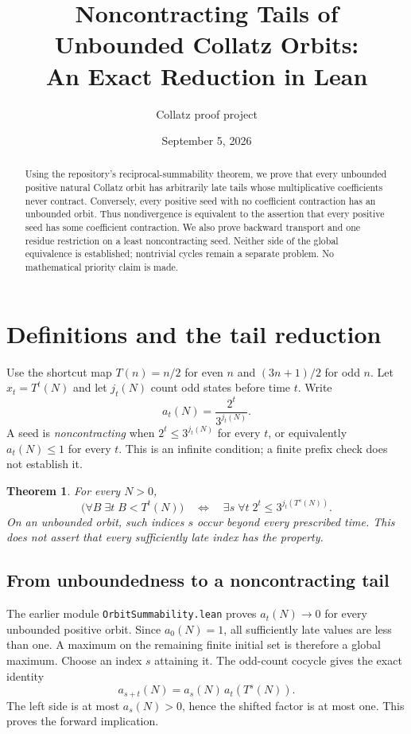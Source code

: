 \documentclass[10pt]{article}
\title{Noncontracting Tails of Unbounded Collatz Orbits:\\An Exact Reduction in Lean}
\author{Collatz proof project}
\date{September 5, 2026}
\newtheorem{theorem}{Theorem}
\begin{document}
\maketitle
\begin{abstract}
Using the repository's reciprocal-summability theorem, we prove that every
unbounded positive natural Collatz orbit has arbitrarily late tails whose
multiplicative coefficients never contract. Conversely, every positive
seed with no coefficient contraction has an unbounded orbit. Thus
nondivergence is equivalent to the assertion that every positive seed
has some coefficient contraction. We also prove backward transport and
one residue restriction on a least noncontracting seed. Neither side of
the global equivalence is established; nontrivial cycles remain a separate
problem. No mathematical priority claim is made.
\end{abstract}

\section{Definitions and the tail reduction}
Use the shortcut map $T(n)=n/2$ for even $n$ and $(3n+1)/2$ for odd $n$.
Let $x_t=T^t(N)$ and let $j_t(N)$ count odd states before time $t$. Write
\[
a_t(N)=\frac{2^t}{3^{j_t(N)}}.
\]
A seed is \emph{noncontracting} when $2^t\le3^{j_t(N)}$ for every $t$,
or equivalently $a_t(N)\le1$ for every $t$. This is an infinite condition;
a finite prefix check does not establish it.
\begin{theorem}\label{thm:tail}
For every $N>0$,
\[
\bigl(\forall B\;\exists t\;B<T^t(N)\bigr)
\quad\Longleftrightarrow\quad
\exists s\;\forall t\;2^t\le3^{j_t(T^s(N))}.
\]
On an unbounded orbit, such indices $s$ occur beyond every prescribed time.
This does not assert that every sufficiently late index has the property.
\end{theorem}

\subsection*{From unboundedness to a noncontracting tail}
The earlier module \texttt{OrbitSummability.lean} proves $a_t(N)\to0$
for every unbounded positive orbit. Since $a_0(N)=1$, all sufficiently
late values are less than one. A maximum on the remaining finite initial
set is therefore a global maximum. Choose an index $s$ attaining it.
The odd-count cocycle gives the exact identity
\[
a_{s+t}(N)=a_s(N)\,a_t(T^s(N)).
\]
The left side is at most $a_s(N)>0$, hence the shifted factor is at most
one. This proves the forward implication.
\end{document}
